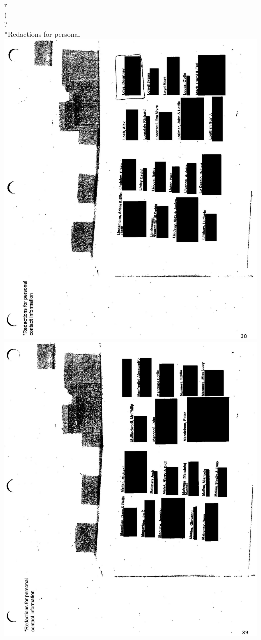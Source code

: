 \documentclass[10pt]{article}
\begin{document}
r\\
(\\
\(?\)\\
*Redactions for personal\\
\includegraphics[max width=\textwidth, center]{2025_02_27_dd68c3d38de88f0516d9g-155}\\
\includegraphics[max width=\textwidth, center]{2025_02_27_dd68c3d38de88f0516d9g-156}\\
\end{document}
